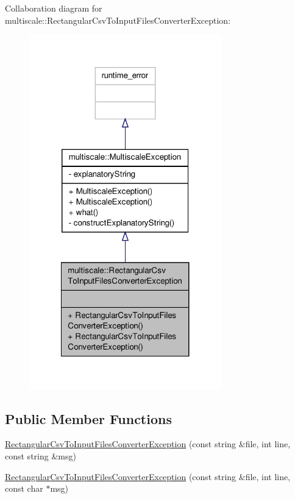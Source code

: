 Collaboration diagram for multiscale\-:\-:Rectangular\-Csv\-To\-Input\-Files\-Converter\-Exception\-:
\nopagebreak
\begin{figure}[H]
\begin{center}
\leavevmode
\includegraphics[width=236pt]{classmultiscale_1_1RectangularCsvToInputFilesConverterException__coll__graph}
\end{center}
\end{figure}
\subsection*{Public Member Functions}
\begin{DoxyCompactItemize}
\item 
\hyperlink{classmultiscale_1_1RectangularCsvToInputFilesConverterException_aceecb7819828a8c5855ec4ae33ea8000}{Rectangular\-Csv\-To\-Input\-Files\-Converter\-Exception} (const string \&file, int line, const string \&msg)
\item 
\hyperlink{classmultiscale_1_1RectangularCsvToInputFilesConverterException_ada0b0ebc1c28661e6c90a37c6d8c3302}{Rectangular\-Csv\-To\-Input\-Files\-Converter\-Exception} (const string \&file, int line, const char $\ast$msg)
\end{DoxyCompactItemize}



